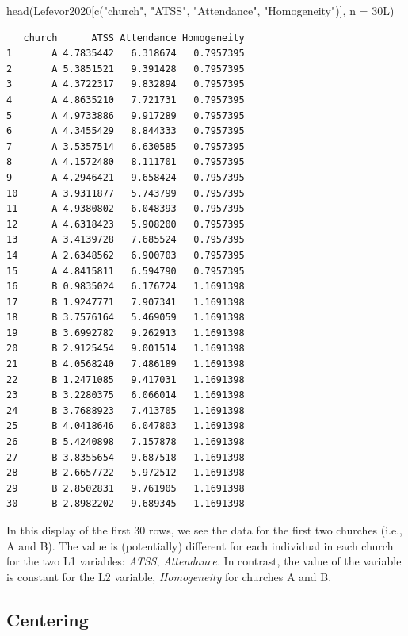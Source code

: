\documentclass[
  11pt,
]{book}
\newenvironment{Shaded}{\begin{snugshade}}{\end{snugshade}}
\newcommand{\AttributeTok}[1]{\textcolor[rgb]{0.77,0.63,0.00}{#1}}
\newcommand{\FunctionTok}[1]{\textcolor[rgb]{0.00,0.00,0.00}{#1}}
\newcommand{\NormalTok}[1]{#1}
\newcommand{\StringTok}[1]{\textcolor[rgb]{0.31,0.60,0.02}{#1}}
\begin{document}
\begin{Shaded}
\begin{Highlighting}[]
\FunctionTok{head}\NormalTok{(Lefevor2020[}\FunctionTok{c}\NormalTok{(}\StringTok{"church"}\NormalTok{, }\StringTok{"ATSS"}\NormalTok{, }\StringTok{"Attendance"}\NormalTok{, }\StringTok{"Homogeneity"}\NormalTok{)], }\AttributeTok{n =}\NormalTok{ 30L)}
\end{Highlighting}
\end{Shaded}

\begin{verbatim}
   church      ATSS Attendance Homogeneity
1       A 4.7835442   6.318674   0.7957395
2       A 5.3851521   9.391428   0.7957395
3       A 4.3722317   9.832894   0.7957395
4       A 4.8635210   7.721731   0.7957395
5       A 4.9733886   9.917289   0.7957395
6       A 4.3455429   8.844333   0.7957395
7       A 3.5357514   6.630585   0.7957395
8       A 4.1572480   8.111701   0.7957395
9       A 4.2946421   9.658424   0.7957395
10      A 3.9311877   5.743799   0.7957395
11      A 4.9380802   6.048393   0.7957395
12      A 4.6318423   5.908200   0.7957395
13      A 3.4139728   7.685524   0.7957395
14      A 2.6348562   6.900703   0.7957395
15      A 4.8415811   6.594790   0.7957395
16      B 0.9835024   6.176724   1.1691398
17      B 1.9247771   7.907341   1.1691398
18      B 3.7576164   5.469059   1.1691398
19      B 3.6992782   9.262913   1.1691398
20      B 2.9125454   9.001514   1.1691398
21      B 4.0568240   7.486189   1.1691398
22      B 1.2471085   9.417031   1.1691398
23      B 3.2280375   6.066014   1.1691398
24      B 3.7688923   7.413705   1.1691398
25      B 4.0418646   6.047803   1.1691398
26      B 5.4240898   7.157878   1.1691398
27      B 3.8355654   9.687518   1.1691398
28      B 2.6657722   5.972512   1.1691398
29      B 2.8502831   9.761905   1.1691398
30      B 2.8982202   9.689345   1.1691398
\end{verbatim}

In this display of the first 30 rows, we see the data for the first two churches (i.e., A and B). The value is (potentially) different for each individual in each church for the two L1 variables: \emph{ATSS}, \emph{Attendance.} In contrast, the value of the variable is constant for the L2 variable, \emph{Homogeneity} for churches A and B.

\hypertarget{centering}{%
\subsection{Centering}\label{centering}}
\end{document}
